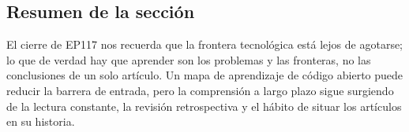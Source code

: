 \subsection{Resumen de la sección}

El cierre de EP117 nos recuerda que la frontera tecnológica está lejos de agotarse; lo que de verdad hay que aprender son los problemas y las fronteras, no las conclusiones de un solo artículo. Un mapa de aprendizaje de código abierto puede reducir la barrera de entrada, pero la comprensión a largo plazo sigue surgiendo de la lectura constante, la revisión retrospectiva y el hábito de situar los artículos en su historia.
